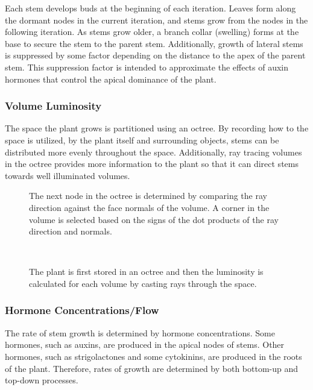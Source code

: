 \documentclass[10pt]{article}
\begin{document}
Each stem develops buds at the beginning of each iteration. Leaves form along the dormant nodes in the current iteration, and stems grow from the nodes in the following iteration. As stems grow older, a branch collar (swelling) forms at the base to secure the stem to the parent stem. Additionally, growth of lateral stems is suppressed by some factor depending on the distance to the apex of the parent stem. This suppression factor is intended to approximate the effects of auxin hormones that control the apical dominance of the plant.

\subsubsection{Volume Luminosity}
The space the plant grows is partitioned using an octree. By recording how to the space is utilized, by the plant itself and surrounding objects, stems can be distributed more evenly throughout the space. Additionally, ray tracing volumes in the octree provides more information to the plant so that it can direct stems towards well illuminated volumes.

\begin{figure}[H]
 \begin{minipage}[t]{0.48\textwidth}
  \centering
  
  \caption{The next node in the octree is determined by comparing the ray direction against the face normals of the volume. A corner in the volume is selected based on the signs of the dot products of the ray direction and normals.}
 \end{minipage}
 \hfill
 \begin{minipage}[t]{0.48\textwidth}
  \centering
   \\
  \caption{The plant is first stored in an octree and then the luminosity is calculated for each volume by casting rays through the space.}
 \end{minipage}
\end{figure}

\subsubsection{Hormone Concentrations/Flow}
The rate of stem growth is determined by hormone concentrations. Some hormones, such as auxins, are produced in the apical nodes of stems. Other hormones, such as strigolactones and some cytokinins, are produced in the roots of the plant. Therefore, rates of growth are determined by both bottom-up and top-down processes.
\end{document}
